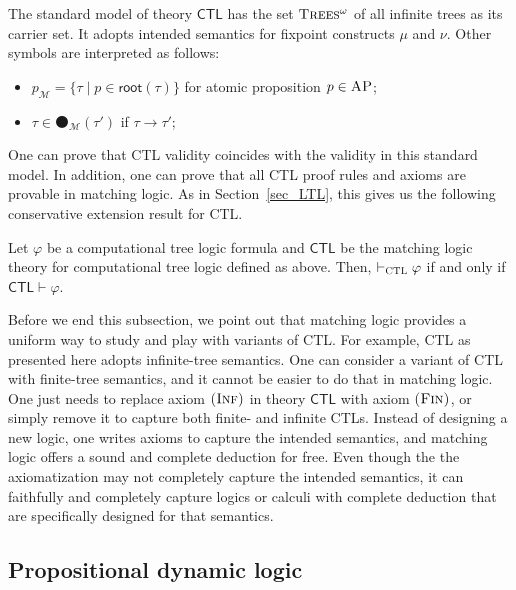 \documentclass[acmsmall,review,anonymous]{acmart}
\newcommand{\MM}{\mathcal{M}}
\newcommand{\MLCTL}{\mathsf{CTL}}
\newcommand{\prule}[1]{\textsc{(#1)}}
\newcommand{\AP}{\textsc{AP}}
\newcommand{\snext}{{\medbullet}}
\newcommand{\rt}{\mathsf{root}}
\newcommand{\infTrees}{\textsc{Trees$^\omega$}\xspace}
\newcommand{\Inf}{\prule{Inf}\xspace}
\newcommand{\Fin}{\prule{Fin}\xspace}
\newcommand{\CTL}{{\textsc{CTL}}}
\begin{document}
The standard model of theory $\MLCTL$ has the set $\infTrees$ of all infinite trees
as its carrier set.
It adopts intended semantics for fixpoint constructs $\mu$ and $\nu$.
Other symbols are interpreted as follows:
\begin{itemize}
\item $p_\MM = \{ \tau \mid p \in \rt(\tau) \}$ for atomic proposition $p \in \AP$;
\item $\tau \in \snext_\MM(\tau')$ if $\tau \to \tau'$;
\end{itemize}
One can prove that CTL validity coincides with the validity in this standard model.
In addition, one can prove that all CTL proof rules and axioms are provable
in matching logic.
As in Section~\ref{sec_LTL},
this gives us the following conservative extension result for CTL.
\begin{theorem}
Let $\varphi$ be a computational tree logic formula
and $\MLCTL$ be the matching logic theory for computational tree logic defined as above.
Then,
$\vdash_\CTL \varphi$ if and only if
$\MLCTL \vdash \varphi$.
\end{theorem}

Before we end this subsection, we point out that matching logic
provides a uniform way to study and play with variants of CTL.
For example, CTL as presented here adopts infinite-tree semantics.
One can consider a variant of CTL with finite-tree semantics, and it cannot be easier
to do that in matching logic.
One just needs to replace axiom $\Inf$ in theory $\MLCTL$ with axiom $\Fin$,
or simply remove it to capture both finite- and infinite CTLs.
Instead of designing a new logic, one writes axioms to capture
the intended semantics, and matching logic offers a sound and complete deduction for free.
Even though the the axiomatization may not completely capture the intended semantics,
it can faithfully and completely capture logics or calculi with complete deduction
that are specifically designed for that semantics.


\subsection{Propositional dynamic logic}
\end{document}
